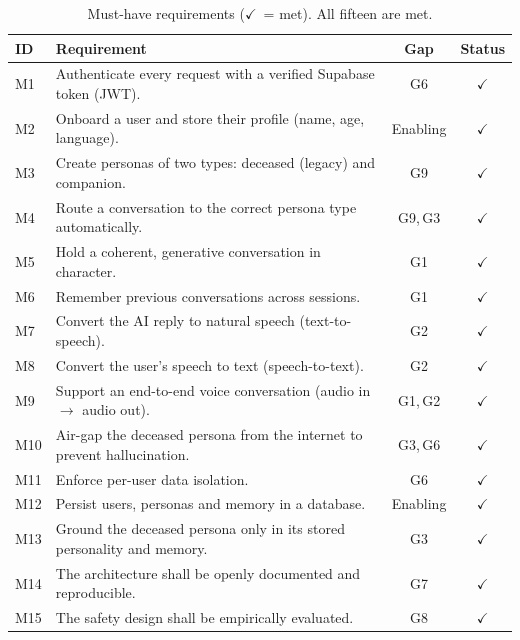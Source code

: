 \documentclass[11pt,a4paper]{report}
\let\amscheckmark\checkmark
\renewcommand{\checkmark}{\ensuremath{\amscheckmark}}
\begin{document}
\begin{table}[htbp]
\centering
\caption{Must-have requirements (\checkmark\ = met). All fifteen are met.}
\label{tab:must}
\small
\begin{tabularx}{\linewidth}{@{}l X c c@{}}
\toprule
\textbf{ID} & \textbf{Requirement} & \textbf{Gap} & \textbf{Status} \\
\midrule
M1  & Authenticate every request with a verified Supabase token (JWT). & G6 & \checkmark \\
M2  & Onboard a user and store their profile (name, age, language). & Enabling & \checkmark \\
M3  & Create personas of two types: deceased (legacy) and companion. & G9 & \checkmark \\
M4  & Route a conversation to the correct persona type automatically. & G9,\,G3 & \checkmark \\
M5  & Hold a coherent, generative conversation in character. & G1 & \checkmark \\
M6  & Remember previous conversations across sessions. & G1 & \checkmark \\
M7  & Convert the AI reply to natural speech (text-to-speech). & G2 & \checkmark \\
M8  & Convert the user's speech to text (speech-to-text). & G2 & \checkmark \\
M9  & Support an end-to-end voice conversation (audio in $\rightarrow$ audio out). & G1,\,G2 & \checkmark \\
M10 & Air-gap the deceased persona from the internet to prevent hallucination. & G3,\,G6 & \checkmark \\
M11 & Enforce per-user data isolation. & G6 & \checkmark \\
M12 & Persist users, personas and memory in a database. & Enabling & \checkmark \\
M13 & Ground the deceased persona only in its stored personality and memory. & G3 & \checkmark \\
M14 & The architecture shall be openly documented and reproducible. & G7 & \checkmark \\
M15 & The safety design shall be empirically evaluated. & G8 & \checkmark \\
\bottomrule
\end{tabularx}
\end{table}
\end{document}
